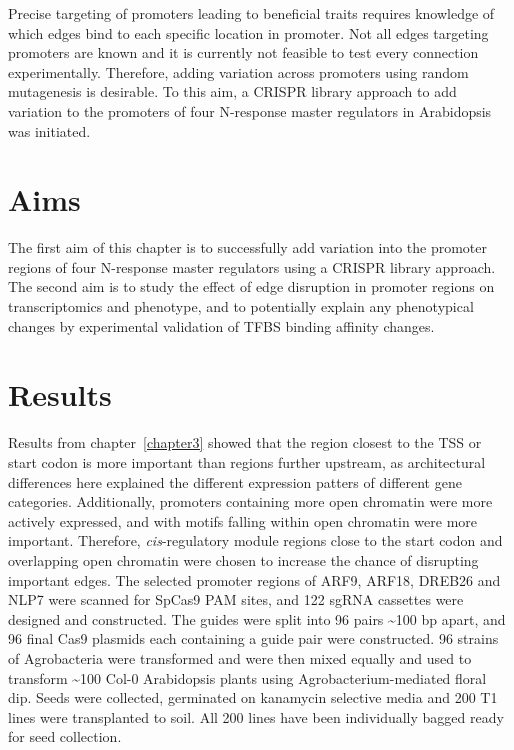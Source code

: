 \documentclass[../main.tex]{subfiles}
\begin{document}
Precise targeting of promoters leading to beneficial traits requires knowledge of which edges bind to each specific location in promoter.
Not all edges targeting promoters are known and it is currently not feasible to test every connection experimentally.
Therefore, adding variation across promoters using random mutagenesis is desirable.
To this aim, a CRISPR library approach to add variation to the promoters of four N-response master regulators in Arabidopsis was initiated.

\section{Aims}\label{chapter7:aims}
The first aim of this chapter is to successfully add variation into the promoter regions of four N\hyp{}response master regulators using a CRISPR library approach.
The second aim is to study the effect of edge disruption in promoter regions on transcriptomics and phenotype, and to potentially explain any phenotypical changes by experimental validation of TFBS binding affinity changes.

\section{Results}\label{chapter7:results}
Results from chapter~\ref{chapter3} showed that the region closest to the TSS or start codon is more important than regions further upstream, as architectural differences here explained the different expression patters of different gene categories.
Additionally, promoters containing more open chromatin were more actively expressed, and with motifs falling within open chromatin were more important.
Therefore, \textit{cis}\hyp{}regulatory module regions close to the start codon and overlapping open chromatin were chosen to increase the chance of disrupting important edges.
The selected promoter regions of ARF9, ARF18, DREB26 and NLP7 were scanned for SpCas9 PAM sites, and 122 sgRNA cassettes were designed and constructed.
The guides were split into 96 pairs \textasciitilde{}100 bp apart, and 96 final Cas9 plasmids each containing a guide pair were constructed.
96 strains of Agrobacteria were transformed and were then mixed equally and used to transform \textasciitilde{}100 Col-0 Arabidopsis plants using Agrobacterium\hyp{}mediated floral dip.
Seeds were collected, germinated on kanamycin selective media and 200 T1 lines were transplanted to soil.
All 200 lines have been individually bagged ready for seed collection.
\end{document}
